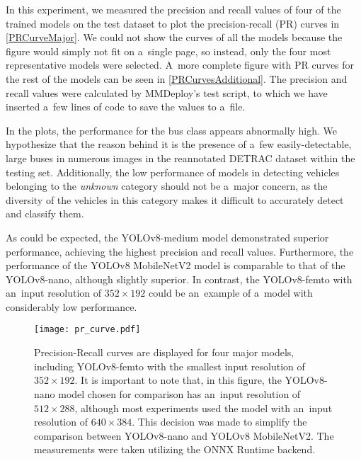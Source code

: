 In this experiment, we measured the precision and recall values of four of the
trained models on the test dataset to plot the precision-recall (PR) curves in
\autoref{PRCurveMajor}. We could not show the curves of all the models because
the figure would simply not fit on a~single page, so instead, only the four most
representative models were selected. A~more complete figure with PR curves for
the rest of the models can be seen in \autoref{PRCurvesAdditional}. The
precision and recall values were calculated by MMDeploy's test script, to which
we have inserted a~few lines of code to save the values to a~file.

In the plots, the performance for the bus class appears abnormally high. We
hypothesize that the reason behind it is the presence of a~few
easily-detectable, large buses in numerous images in the reannotated DETRAC
dataset within the testing set. Additionally, the low performance of models in
detecting vehicles belonging to the \textit{unknown} category should not be
a~major concern, as the diversity of the vehicles in this category makes it
difficult to accurately detect and classify them.

As could be expected, the YOLOv8-medium model demonstrated superior performance,
achieving the highest precision and recall values. Furthermore, the performance
of the YOLOv8 MobileNetV2 model is comparable to that of the YOLOv8-nano,
although slightly superior. In contrast, the YOLOv8-femto with an~input
resolution of $352 \times 192$ could be an~example of a~model with considerably
low performance.

\begin{figure}[H]
        \centering
        \texttt{[image: pr\_curve.pdf]}
        \caption{Precision-Recall curves are displayed for four major models,
        including YOLOv8-femto with the smallest input resolution of $352 \times
        192$. It is important to note that, in this figure, the YOLOv8-nano
        model chosen for comparison has an~input resolution of $512 \times 288$,
        although most experiments used the model with an~input resolution of
        $640 \times 384$. This decision was made to simplify the comparison
        between YOLOv8-nano and YOLOv8 MobileNetV2. The measurements were taken
        utilizing the ONNX Runtime backend.}
        \label{PRCurveMajor}
\end{figure}






